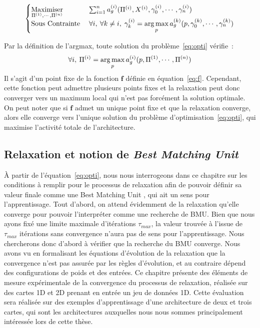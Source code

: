\documentclass[../main]{subfiles}
\begin{document}
\begin{equation}\label{eq:opti}
	\begin{cases}
	\operatorname*{Maximiser}\limits_{\Pi^{({1})}, \cdots, \Pi^{({n})}}\;& \sum_{i = 1}^n a_g^{({i})}(\Pi^{({i})},X^{({i})},\gamma_0^{({i})}, \cdots, \gamma_n^{({i})}) \\
	\text{Sous Contrainte}\; &\forall i,\:\forall k \neq i, \; \gamma_k^{({i})} = \operatorname*{arg\,max}\limits_p a_g^{({k})}(p,\gamma_0^{({k})}, \cdots, \gamma_n^{({k})})
	\end{cases}
\end{equation}

Par la définition de l'argmax, toute solution du problème~\ref{eq:opti} vérifie~:
$$\forall i, \: \Pi^{({i})} = \operatorname*{arg\,max}_p a_g^{({i})}(p, \Pi^{({1})}, \cdots, \Pi^{({n})})$$
Il s'agit d'un point fixe de la fonction $\mathbf{f}$ définie en équation~\ref{eq:f}.
Cependant, cette fonction peut admettre plusieurs points fixes et la relaxation peut donc converger vers un maximum local qui n'est pas forcément la solution optimale.
On peut noter que si $\mathbf{f}$ admet un unique point fixe et que la relaxation converge, alors elle converge vers l'unique solution du problème d'optimisation~\ref{eq:opti}, qui maximise l'activité totale de l'architecture.

\subsection{Relaxation et notion de \emph{Best Matching Unit}}

\`A partir de l'équation~\ref{eq:opti}, nous nous interrogeons dans ce chapitre sur les conditions à remplir pour le processus de relaxation afin de pouvoir définir sa valeur finale comme une \og Best Matching Unit \fg{}, qui ait un sens pour l'apprentissage.
Tout d'abord, on attend évidemment de la relaxation qu'elle converge pour pouvoir l'interpréter comme une recherche de BMU. Bien que nous ayons fixé une limite maximale d'itérations $\tau_{max}$, la valeur trouvée à l'issue de $\tau_{max}$ itérations sans convergence n'aura pas de sens pour l'apprentissage.
Nous chercherons donc d'abord à vérifier que la recherche du BMU converge.
Nous avons vu en formalisant les équations d'évolution de la relaxation que la convergence n'est pas assurée par les règles d'évolution, et au contraire dépend des configurations de poids et des entrées.
Ce chapitre présente des éléments de mesure expérimentale de la convergence du processus de relaxation, réalisée sur des cartes 1D et 2D prenant en entrée un jeu de données 1D.
Cette évaluation  sera réalisée sur des exemples d'apprentissage d'une architecture de deux et trois cartes, qui sont les architectures auxquelles nous nous sommes principalement intéressée lors de cette thèse.
\end{document}
